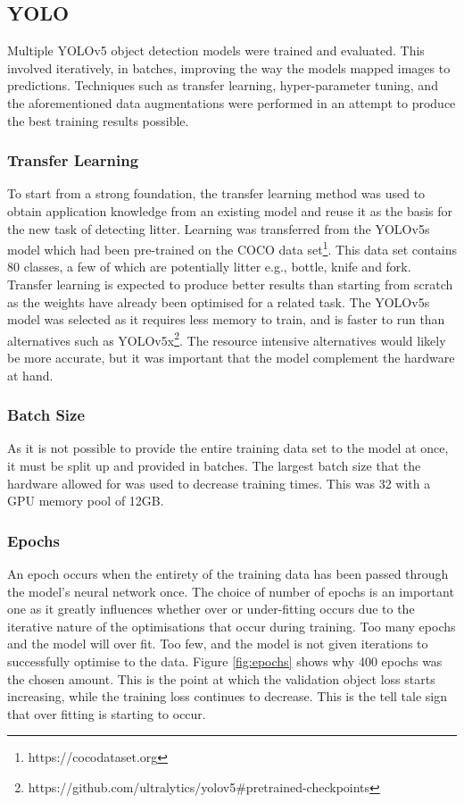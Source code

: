 \documentclass{thesis}
\begin{document}
\subsection{YOLO}

Multiple YOLOv5 object detection models were trained and evaluated. This involved iteratively, in batches, improving the way the models mapped images to predictions. Techniques such as transfer learning, hyper-parameter tuning, and the aforementioned data augmentations were performed in an attempt to produce the best training results possible.

\subsubsection{Transfer Learning}

To start from a strong foundation, the transfer learning method was used to obtain application knowledge from an existing model and reuse it as the basis for the new task of detecting litter. Learning was transferred from the YOLOv5s model which had been pre-trained on the COCO data set\footnote{https://cocodataset.org}. This data set contains 80 classes, a few of which are potentially litter e.g., bottle, knife and fork. Transfer learning is expected to produce better results than starting from scratch as the weights have already been optimised for a related task. The YOLOv5s model was selected as it requires less memory to train, and is faster to run than alternatives such as YOLOv5x\footnote{https://github.com/ultralytics/yolov5\#pretrained-checkpoints}. The resource intensive alternatives would likely be more accurate, but it was important that the model complement the hardware at hand.

\subsubsection{Batch Size} 

As it is not possible to provide the entire training data set to the model at once, it must be split up and provided in batches. The largest batch size that the hardware allowed for was used to decrease training times. This was 32 with a GPU memory pool of 12GB.

\subsubsection{Epochs} 

An epoch occurs when the entirety of the training data has been passed through the model's neural network once. The choice of number of epochs is an important one as it greatly influences whether over or under-fitting occurs due to the iterative nature of the optimisations that occur during training. Too many epochs and the model will over fit. Too few, and the model is not given iterations to successfully optimise to the data. Figure \ref{fig:epochs} shows why 400 epochs was the chosen amount. This is the point at which the validation object loss starts increasing, while the training loss continues to decrease. This is the tell tale sign that over fitting is starting to occur.
\end{document}
